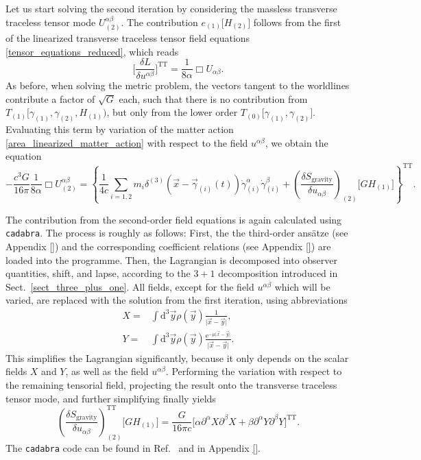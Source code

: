 Let us start solving the second iteration by considering the massless transverse traceless tensor mode $U^{\alpha\beta}_{(2)}$. The contribution $e_{(1)}\lbrack H_{(2)}\rbrack$ follows from the first of the linearized transverse traceless tensor field equations \eqref{tensor_equations_reduced}, which reads
\begin{equation}
  \bigg\lbrack\frac{\delta L}{\delta u^{\alpha\beta}}\bigg\rbrack^\text{TT} = \frac{1}{8\alpha} \Box U_{\alpha\beta}.
\end{equation}
As before, when solving the metric problem, the vectors tangent to the worldlines contribute a factor of $\sqrt{G}$ each, such that there is no contribution from $T_{(1)}\lbrack\gamma_{(1)},\gamma_{(2)},H_{(1)})$, but only from the lower order $T_{(0)}\lbrack\gamma_{(1)},\gamma_{(2)}\rbrack$. Evaluating this term by variation of the matter action \eqref{area_linearized_matter_action} with respect to the field $u^{\alpha\beta}$, we obtain the equation
\begin{equation}\label{area_massless_tt_equation}
  -\frac{c^3G}{16\pi} \frac{1}{8\alpha} \Box U^{\alpha\beta}_{(2)} = \left\{\frac{1}{4c}\sum_{i=1,2} m_i \delta^{(3)}(\vec x-\vec\gamma_{(i)}(t))\dot\gamma^\alpha_{(i)}\dot\gamma^\beta_{(i)} + \left(\frac{\delta S_\text{gravity}}{\delta u_{\alpha\beta}}\right)_{(2)}\lbrack GH_{(1)}\rbrack \right\}^\text{TT}.
\end{equation}

The contribution from the second-order field equations is again calculated using \texttt{cadabra}. The process is roughly as follows: First, the the third-order ansätze (see Appendix \ref{}) and the corresponding coefficient relations (see Appendix \ref{}) are loaded into the programme. Then, the Lagrangian is decomposed into observer quantities, shift, and lapse, according to the $3+1$ decomposition introduced in Sect.~\ref{sect_three_plus_one}. All fields, except for the field $u^{\alpha\beta}$ which will be varied, are replaced with the solution from the first iteration, using abbreviations
\begin{equation}
  \begin{aligned}
    X = &{} \int\mathrm d^3\vec y\rho(\vec y)\frac{1}{\lvert\vec x-\vec y\rvert}, \\
    Y = &{} \int\mathrm d^3\vec y\rho(\vec y)\frac{\mathrm e^{-\mu\lvert\vec x-\vec y\rvert}}{\lvert\vec x-\vec y\rvert}.
  \end{aligned}
\end{equation}
This simplifies the Lagrangian significantly, because it only depends on the scalar fields $X$ and $Y$, as well as the field $u^{\alpha\beta}$. Performing the variation with respect to the remaining tensorial field, projecting the result onto the transverse traceless tensor mode, and further simplifying finally yields
\begin{equation}
  \left(\frac{\delta S_\text{gravity}}{\delta u_{\alpha\beta}}\right)^\text{TT}_{(2)}\lbrack GH_{(1)}\rbrack = \frac{G}{16\pi c}\lbrack\alpha\partial^\alpha X\partial^\beta X + \beta\partial^\alpha Y\partial^\beta Y\rbrack^\text{TT}.
\end{equation}
The \texttt{cadabra} code can be found in Ref.~\cite{area_metric_gravity_code} and in Appendix \ref{}.

